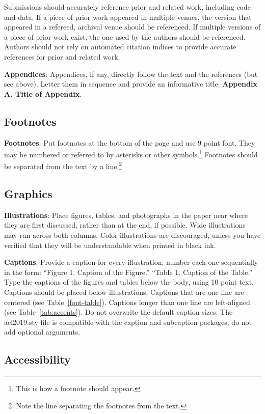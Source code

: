 \documentclass[11pt,a4paper]{article}
\begin{document}
Submissions should accurately reference prior and related work, including code and data. If a piece of prior work appeared in multiple venues, the version that appeared in a refereed, archival venue should be referenced. If multiple versions of a piece of prior work exist, the one used by the authors should be referenced. Authors should not rely on automated citation indices to provide accurate references for prior and related work.

\textbf{Appendices}: Appendices, if any, directly follow the text and the
references (but see above).  Letter them in sequence and provide an
informative title: \textbf{Appendix A. Title of Appendix}.

\subsection{Footnotes}

\textbf{Footnotes}: Put footnotes at the bottom of the page and use 9
point font. They may be numbered or referred to by asterisks or other
symbols.\footnote{This is how a footnote should appear.} Footnotes
should be separated from the text by a line.\footnote{Note the line
separating the footnotes from the text.}

\subsection{Graphics}

\textbf{Illustrations}: Place figures, tables, and photographs in the
paper near where they are first discussed, rather than at the end, if
possible.  Wide illustrations may run across both columns.  Color
illustrations are discouraged, unless you have verified that  
they will be understandable when printed in black ink.

\textbf{Captions}: Provide a caption for every illustration; number each one
sequentially in the form:  ``Figure 1. Caption of the Figure.'' ``Table 1.
Caption of the Table.''  Type the captions of the figures and 
tables below the body, using 10 point text. Captions should be placed below illustrations. Captions that are one line are centered (see Table~\ref{font-table}). Captions longer than one line are left-aligned (see Table~\ref{tab:accents}). Do not overwrite the default caption sizes. The acl2019.sty file is compatible with the caption and subcaption packages; do not add optional arguments.


\subsection{Accessibility}
\label{ssec:accessibility}
\end{document}

